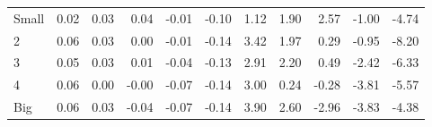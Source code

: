 \begin{table}[!ht]
\begin{tabular}{lrrrrrrrrrr}
    \\
      \cmidrule(r){2-6} \cmidrule(r){7-11}

    Small   & 0.02  & 0.03  & 0.04  & -0.01  & -0.10  & 1.12  & 1.90  & 2.57  & -1.00  & -4.74  \\
         2  & 0.06  & 0.03  & 0.00  & -0.01  & -0.14  & 3.42  & 1.97  & 0.29  & -0.95  & -8.20  \\
         3  & 0.05  & 0.03  & 0.01  & -0.04  & -0.13  & 2.91  & 2.20  & 0.49  & -2.42  & -6.33  \\
         4  & 0.06  & 0.00  & -0.00  & -0.07  & -0.14  & 3.00  & 0.24  & -0.28  & -3.81  & -5.57  \\
    Big     & 0.06  & 0.03  & -0.04  & -0.07  & -0.14  & 3.90  & 2.60  & -2.96  & -3.83  & -4.38  \\

  

  \bottomrule
\end{tabular}
\label{tbl:25_Size_Beta_C97}
\end{table}